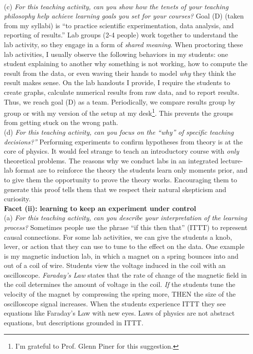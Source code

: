 \documentclass[../../../main.tex]{subfiles}
\begin{document}
\\
\vspace{0.25cm}
(c) \textit{For this teaching activity, can you show how the tenets of your teaching philosophy help achieve learning goals you
set for your courses?}  Goal (D) (taken from my syllabi) is ``to practice scientific experimentation, data analysis, and reporting of results.''  Lab groups (2-4 people) work together to understand the lab activity, so they engage in a form of \textit{shared meaning}.  When proctoring these lab activities, I usually observe the following behaviors in my students: one student explaining to another why something is not working, how to compute the result from the data, or even waving their hands to model \textit{why} they think the result makes sense.  On the lab handouts I provide, I require the students to create graphs, calculate numerical results from raw data, and to report results.  Thus, we reach goal (D) as a team.  Periodically, we compare results group by group or with my version of the setup at my desk\footnote{I'm grateful to Prof. Glenn Piner for this suggestion.}.  This prevents the groups from getting stuck on the wrong path.
\\
\vspace{0.25cm}
(d) \textit{For this teaching activity, can you focus on the ``why'' of specific teaching decisions?''}  Performing experiments to confirm hypotheses from theory is at the core of physics.  It would feel strange to teach an introductory course with \textit{only} theoretical problems.  The reasons why we conduct labs in an integrated lecture-lab format are to reinforce the theory the students learn only moments prior, and to give them the opportunity to prove the theory works.  Encouraging them to generate this proof tells them that we respect their natural skepticism and curiosity.
\\
\vspace{0.25cm}
\textbf{Facet (ii): learning to keep an experiment under control}
\\
\vspace{0.25cm}
(a) \textit{For this teaching activity, can you describe your interpretation of the learning process?}  Sometimes people use the phrase ``if this then that'' (ITTT) to represent causal connections.  For some lab activities, we can give the students a knob, lever, or action that they can use to tune to the effect on the data.  One example is my magnetic induction lab, in which a magnet on a spring bounces into and out of a coil of wire.  Students view the voltage induced in the coil with an oscilloscope.  \textit{Faraday's Law} states that the rate of change of the magnetic field in the coil determines the amount of voltage in the coil.  \textit{If} the students tune the velocity of the magnet by compressing the spring more, THEN the size of the oscilloscope signal increases.  When the students experience ITTT they see equations like Faraday's Law with new eyes.  Laws of physics are not abstract equations, but descriptions grounded in ITTT.
\end{document}
